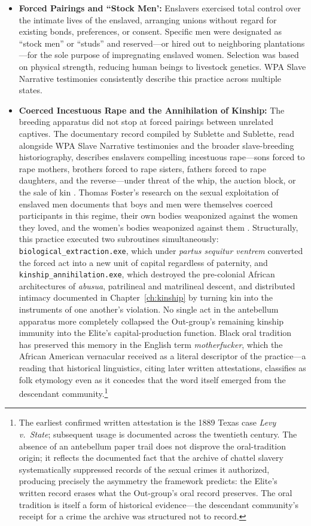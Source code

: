 \begin{itemize}
    \item \textbf{Forced Pairings and ``Stock Men':} Enslavers exercised total control over the intimate lives of the enslaved, arranging unions without regard for existing bonds, preferences, or consent. Specific men were designated as ``stock men'' or ``studs'' and reserved---or hired out to neighboring plantations---for the sole purpose of impregnating enslaved women. Selection was based on physical strength, reducing human beings to livestock genetics. WPA Slave Narrative testimonies consistently describe this practice across multiple states.

    \item \textbf{Coerced Incestuous Rape and the Annihilation of Kinship:} The breeding apparatus did not stop at forced pairings between unrelated captives. The documentary record compiled by Sublette and Sublette, read alongside WPA Slave Narrative testimonies and the broader slave-breeding historiography, describes enslavers compelling incestuous rape---sons forced to rape mothers, brothers forced to rape sisters, fathers forced to rape daughters, and the reverse---under threat of the whip, the auction block, or the sale of kin \cite{sublette, baptist}. Thomas Foster's research on the sexual exploitation of enslaved men documents that boys and men were themselves coerced participants in this regime, their own bodies weaponized against the women they loved, and the women's bodies weaponized against them \cite{foster_rufus}. Structurally, this practice executed two subroutines simultaneously: \texttt{biological\_extraction.exe}, which under \textit{partus sequitur ventrem} converted the forced act into a new unit of capital regardless of paternity, and \texttt{kinship\_annihilation.exe}, which destroyed the pre-colonial African architectures of \textit{abusua}, patrilineal and matrilineal descent, and distributed intimacy documented in Chapter~\ref{ch:kinship} by turning kin into the instruments of one another's violation. No single act in the antebellum apparatus more completely collapsed the Out-group's remaining kinship immunity into the Elite's capital-production function. Black oral tradition has preserved this memory in the English term \textit{motherfucker}, which the African American vernacular received as a literal descriptor of the practice---a reading that historical linguistics, citing later written attestations, classifies as folk etymology even as it concedes that the word itself emerged from the descendant community.\footnote{The earliest confirmed written attestation is the 1889 Texas case \textit{Levy v.\ State}; subsequent usage is documented across the twentieth century. The absence of an antebellum paper trail does not disprove the oral-tradition origin; it reflects the documented fact that the archive of chattel slavery systematically suppressed records of the sexual crimes it authorized, producing precisely the asymmetry the framework predicts: the Elite's written record erases what the Out-group's oral record preserves. The oral tradition is itself a form of historical evidence---the descendant community's receipt for a crime the archive was structured not to record.}


\end{itemize}

